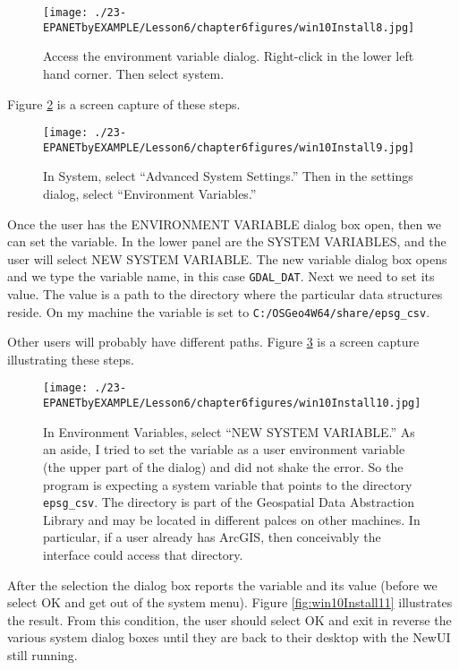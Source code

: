 \begin{figure}[h!] %
   \centering
   \texttt{[image: ./23-EPANETbyEXAMPLE/Lesson6/chapter6figures/win10Install8.jpg]} 
   \caption{Access the environment variable dialog.   Right-click in the lower left hand corner.  Then select system.}
   \label{fig:win10Install8}
\end{figure}

\newpage Figure \ref{fig:win10Install9} is a screen capture of these steps.   
\begin{figure}[h!] %
   \centering
   \texttt{[image: ./23-EPANETbyEXAMPLE/Lesson6/chapter6figures/win10Install9.jpg]} 
   \caption{In System, select ``Advanced System Settings.''   Then in the settings dialog, select ``Environment Variables.''}
   \label{fig:win10Install9}
\end{figure}

\clearpage
Once the user has the ENVIRONMENT VARIABLE dialog box open, then we can set the variable.
In the lower panel are the SYSTEM VARIABLES, and the user will select NEW SYSTEM VARIABLE.
The new variable dialog box opens and we type the variable name, in this case \texttt{GDAL\_DAT}.
Next we need to set its value.
The value is a path to the directory where the particular data structures reside.  
On my machine the variable is set to \texttt{C:/OSGeo4W64/share/epsg\_csv}.

Other users will probably have different paths. 
Figure \ref{fig:win10Install10} is a screen capture illustrating these steps.

\begin{figure}[h!] %
   \centering
   \texttt{[image: ./23-EPANETbyEXAMPLE/Lesson6/chapter6figures/win10Install10.jpg]} 
   \caption{In Environment Variables, select ``NEW SYSTEM VARIABLE.''  As an aside, I tried to set the variable as a user environment variable (the upper part of the dialog) and did not shake the error.  So the program is expecting a system variable that points to the directory \texttt{epsg\_csv}.   The directory is part of the Geospatial Data Abstraction Library and may be located in different palces on other machines.  In particular, if a user already has ArcGIS, then conceivably the interface could access that directory.}
   \label{fig:win10Install10}
\end{figure}

After the selection the dialog box reports the variable and its value (before we select OK and get out of the system menu).
Figure \ref{fig:win10Install11} illustrates the result.  
From this condition, the user should select OK and exit in reverse the various system dialog boxes until they are back to their desktop with the NewUI still running.

